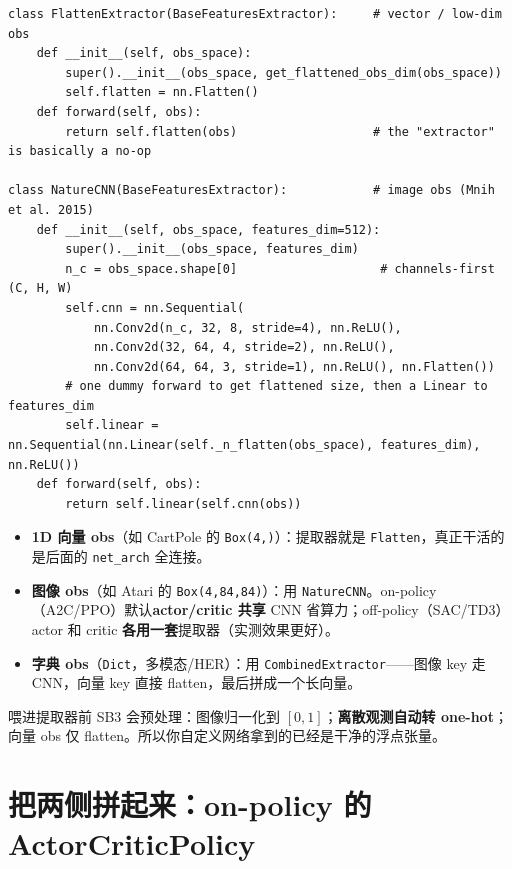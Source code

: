 \documentclass[11pt,a4paper]{article}
\begin{document}
\begin{lstlisting}
class FlattenExtractor(BaseFeaturesExtractor):     # vector / low-dim obs
    def __init__(self, obs_space):
        super().__init__(obs_space, get_flattened_obs_dim(obs_space))
        self.flatten = nn.Flatten()
    def forward(self, obs):
        return self.flatten(obs)                   # the "extractor" is basically a no-op

class NatureCNN(BaseFeaturesExtractor):            # image obs (Mnih et al. 2015)
    def __init__(self, obs_space, features_dim=512):
        super().__init__(obs_space, features_dim)
        n_c = obs_space.shape[0]                    # channels-first (C, H, W)
        self.cnn = nn.Sequential(
            nn.Conv2d(n_c, 32, 8, stride=4), nn.ReLU(),
            nn.Conv2d(32, 64, 4, stride=2), nn.ReLU(),
            nn.Conv2d(64, 64, 3, stride=1), nn.ReLU(), nn.Flatten())
        # one dummy forward to get flattened size, then a Linear to features_dim
        self.linear = nn.Sequential(nn.Linear(self._n_flatten(obs_space), features_dim), nn.ReLU())
    def forward(self, obs):
        return self.linear(self.cnn(obs))
\end{lstlisting}

\begin{itemize}
\item \textbf{1D 向量 obs}（如 CartPole 的 \texttt{Box(4,)}）：提取器就是 \texttt{Flatten}，真正干活的是后面的 \texttt{net\_arch} 全连接。
\item \textbf{图像 obs}（如 Atari 的 \texttt{Box(4,84,84)}）：用 \texttt{NatureCNN}。on-policy（A2C/PPO）默认\textbf{actor/critic 共享} CNN 省算力；off-policy（SAC/TD3）actor 和 critic \textbf{各用一套}提取器（实测效果更好）。
\item \textbf{字典 obs}（\texttt{Dict}，多模态/HER）：用 \texttt{CombinedExtractor}——图像 key 走 CNN，向量 key 直接 flatten，最后拼成一个长向量。
\end{itemize}

\begin{keybox}[预处理悄悄做的事]
喂进提取器前 SB3 会预处理：图像归一化到 $[0,1]$；\textbf{离散观测自动转 one-hot}；向量 obs 仅 flatten。所以你自定义网络拿到的已经是干净的浮点张量。
\end{keybox}

\section{把两侧拼起来：on-policy 的 ActorCriticPolicy}
\label{sec:onpolicy}
\end{document}
